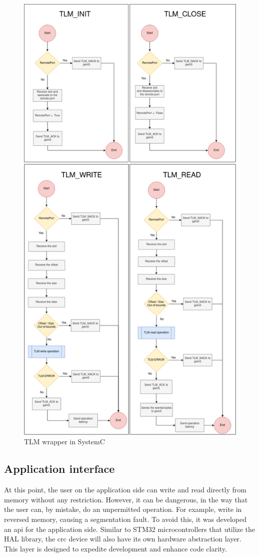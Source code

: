 \begin{figure}[H]
	\centering
 	\includegraphics[width=0.7\linewidth]{Images/TLMWrapper_SystemC.png} 
 	\caption{TLM wrapper in SystemC}
\end{figure}

\subsection{Application interface}

At this point, the user on the application side can write and read directly from memory without any restriction. However, it can be
dangerous, in the way that the user can, by mistake, do an unpermitted operation. For example, write in reversed memory, causing a
segmentation fault. To avoid this, it was developed an \gls{api} for the application side. Similar to STM32 microcontrollers that 
utilize the HAL library, the \gls{crc} device will also have its own hardware abstraction layer. This layer is designed to expedite 
development and enhance code clarity.

